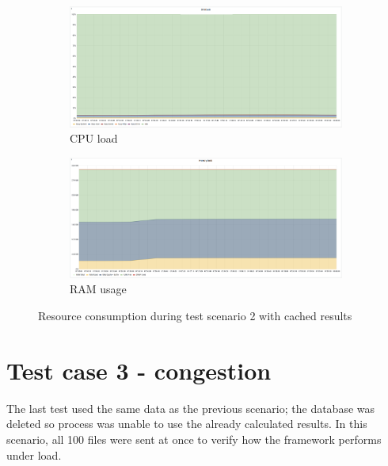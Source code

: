 \begin{figure}[H]
    \begin{subfigure}[h]{0.5\linewidth}
        \centering
        \includegraphics[width=1\linewidth]{other-fig/tests/burst_cached_cpu.png}
        \caption{CPU load}
    \end{subfigure}
    \hfill
    \begin{subfigure}[h]{0.5\linewidth}
        \centering
        \includegraphics[width=1\linewidth]{other-fig/tests/burst_cached_ram.png}
        \caption{RAM usage}
    \end{subfigure}
    \caption{Resource consumption during test scenario 2 with cached results}
    \label{fig:batch_cached_resources}
\end{figure}

\section{Test case 3 - congestion}

The last test used the same data as the previous scenario; the database was deleted so process was unable to use the already calculated results. In this scenario, all 100 files were sent at once to verify how the framework performs under load.

